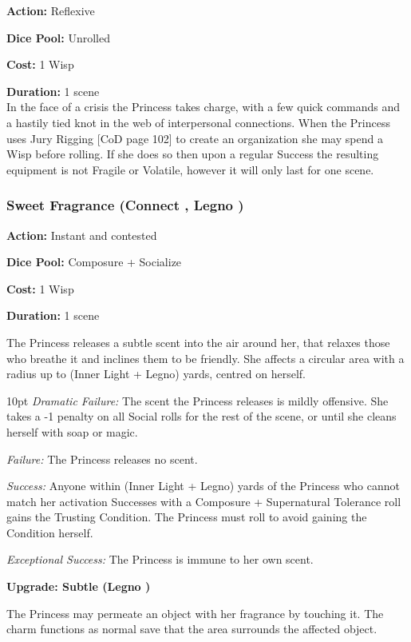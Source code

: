\noindent \textbf{Action:} Reflexive

\noindent \textbf{Dice Pool:} Unrolled

\noindent \textbf{Cost:} 1 Wisp

\noindent \textbf{Duration:} 1 scene \\

In the face of a crisis the Princess takes charge, with a few quick commands and a hastily tied knot in the web of interpersonal connections. When the Princess uses Jury Rigging [CoD page 102] to create an organization she may spend a Wisp before rolling. If she does so then upon a regular Success the resulting equipment is not Fragile or Volatile, however it will only last for one scene. 

\subsubsection*{Sweet Fragrance (Connect \textbullet, Legno \textbullet)}

\noindent \textbf{Action:} Instant and contested

\noindent \textbf{Dice Pool:} Composure + Socialize

\noindent \textbf{Cost:} 1 Wisp

\noindent \textbf{Duration:} 1 scene

The Princess releases a subtle scent into the air around her, that relaxes those who breathe it and inclines them to be friendly. She affects a circular area with a radius up to (Inner Light + Legno) yards, centred on
herself.

\begin{myindentpar}{10pt}    \emph{Dramatic Failure:} The scent the Princess releases is mildly offensive. She takes a -1 penalty on all Social rolls for the rest of the scene, or until she cleans herself with soap or magic.

    \emph{Failure:} The Princess releases no scent. 

    \emph{Success:} Anyone within (Inner Light + Legno) yards of the Princess who cannot match her activation Successes with a  Composure + Supernatural Tolerance roll gains the Trusting Condition. The Princess must roll to avoid gaining the Condition herself.

    \emph{Exceptional Success:} The Princess is immune to her own scent.
	
	\textbf{Upgrade: Subtle (Legno \textbullet\textbullet)}

	The Princess may permeate an object with her fragrance by touching it. The charm functions as normal save that the area surrounds the affected object.\end{myindentpar}

